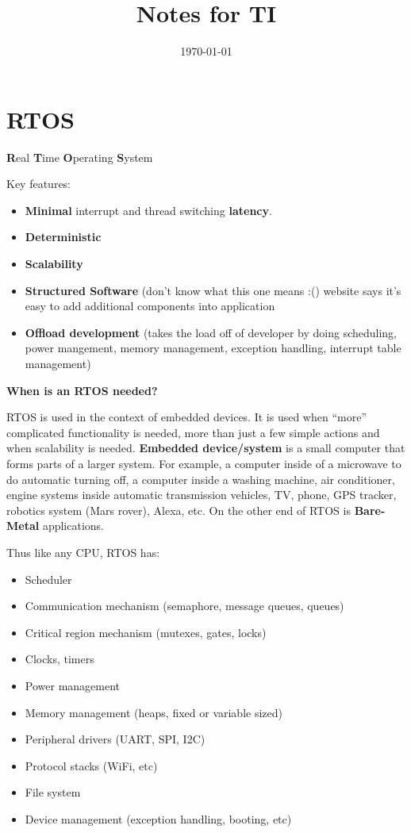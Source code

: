 \documentclass[11pt]{article}
\date{\today}
\title{Notes for TI}
\begin{document}
\maketitle
\tableofcontents


\section{RTOS}
\label{sec:org5f41da6}
\textbf{R}eal \textbf{T}ime \textbf{O}perating \textbf{S}ystem

Key features:
\begin{itemize}
\item \textbf{Minimal} interrupt and thread switching \textbf{latency}.
\item \textbf{Deterministic}
\item \textbf{Scalability}
\item \textbf{Structured Software} (don't know what this one means :()
website says it's easy to add additional components into application
\item \textbf{Offload development} (takes the load off of developer by
doing scheduling, power mangement, memory management, exception
handling, interrupt table management)
\end{itemize}

\textbf{When is an RTOS needed?}

RTOS is used in the context of embedded devices. It is used when
``more'' complicated functionality is needed, more than just a few
simple actions and when scalability is needed. \textbf{Embedded
device/system} is a small computer that forms parts of a larger
system. For example, a computer inside of a microwave to do automatic
turning off, a computer inside a washing machine, air conditioner,
engine systems inside automatic transmission vehicles, TV, phone, GPS
tracker, robotics system (Mars rover), Alexa, etc.
On the other end of RTOS is \textbf{Bare-Metal} applications.

Thus like any CPU, RTOS has:
\begin{itemize}
\item Scheduler
\item Communication mechanism (semaphore, message queues, queues)
\item Critical region mechanism (mutexes, gates, locks)
\item Clocks, timers
\item Power management
\item Memory management (heaps, fixed or variable sized)
\item Peripheral drivers (UART, SPI, I2C)
\item Protocol stacks (WiFi, etc)
\item File system
\item Device management (exception handling, booting, etc)
\end{itemize}
\end{document}
